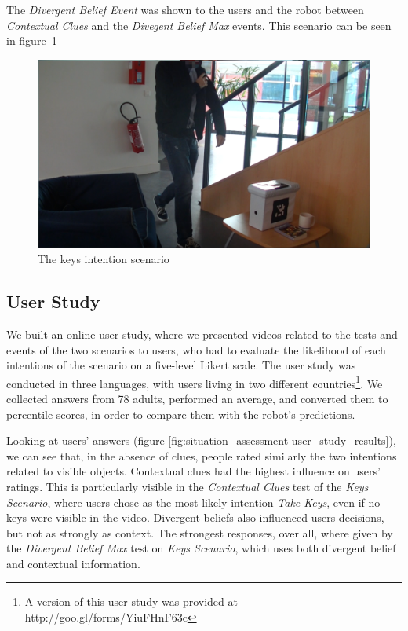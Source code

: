 The \textit{Divergent Belief Event} was shown to the users and the robot between \textit{Contextual Clues} and the \textit{Divegent Belief Max} events. This scenario can be seen in figure~\ref{fig:situation_assessment-keys}

 \begin{figure}[ht!]
	\centering
	\includegraphics[scale=0.5]{img/situation_assessment/keys2-blur.pdf}
	\caption{The keys intention scenario}
	\label{fig:situation_assessment-keys}
\end{figure}

\subsection{User Study}
We built an online user study, where we presented videos related to the tests and events of the two scenarios to users, who had to evaluate the likelihood of each intentions of the scenario
on a five-level Likert scale. The user study was conducted in three languages, with users living in two different countries\footnote{A version of this user study was provided at http://goo.gl/forms/YiuFHnF63c}. We collected answers from 78 adults, performed an average, and converted them to percentile scores, in order to compare them with the robot's predictions.

Looking at users' answers (figure \ref{fig:situation_assessment-user_study_results}), we can see that, in the absence of clues, people rated similarly the two intentions related to visible objects. Contextual clues had the highest influence on users' ratings. This is particularly visible in the \textit{Contextual Clues} test of the \textit{Keys Scenario}, where users chose as the most likely intention \textit{Take Keys}, even if no keys were visible in the video. Divergent beliefs also influenced users decisions, but not as strongly as context. The strongest responses, over all, where given by the \textit{Divergent Belief Max} test on \textit{Keys Scenario}, which uses both divergent belief and contextual information.

